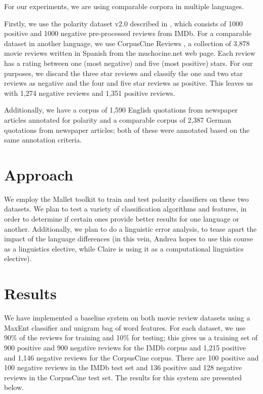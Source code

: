\documentclass[11pt]{article}
\begin{document}
For our experiments, we are using comparable corpora in multiple languages.

Firstly, we use the polarity dataset v2.0 described in \cite{pang2004}, which consists of 1000 positive and 1000 negative pre-processed reviews from IMDb.  For a comparable dataset in another language, we use CorpusCine Reviews \cite{cruzmata2011}, a collection of 3,878 movie reviews written in Spanish from the muchocine.net web page.  Each review has a rating between one (most negative) and five (most positive) stars.  For our purposes, we discard the three star reviews and classify the one and two star reviews as negative and the four and five star reviews as positive.  This leaves us with 1,274 negative reviews and 1,351 positive reviews.

Additionally, we have a corpus of 1,590 English quotations from newspaper articles annotated for polarity and a comparable corpus of 2,387 German quotations from newspaper articles; both of these were annotated based on the same annotation criteria.

\section{Approach}

We employ the Mallet toolkit to train and test polarity classifiers on these two datasets.  We plan to test a variety of classification algorithms and features, in order to determine if certain ones provide better results for one language or another.  Additionally, we plan to do a linguistic error analysis, to tease apart the impact of the language differences (in this vein, Andrea hopes to use this course as a linguistics elective, while Claire is using it as a computational linguistics elective).

\section{Results}

We have implemented a baseline system on both movie review datasets using a MaxEnt classifier and unigram bag of word features.  For each dataset, we use 90\% of the reviews for training and 10\% for testing; this gives us a training set of 900 positive and 900 negative reviews for the IMDb corpus and 1,215 positive and 1,146 negative reviews for the CorpusCine corpus.  There are 100 positive and 100 negative reviews in the IMDb test set and 136 positive and 128 negative reviews in the CorpusCine test set.  The results for this system are presented below.
\end{document}
